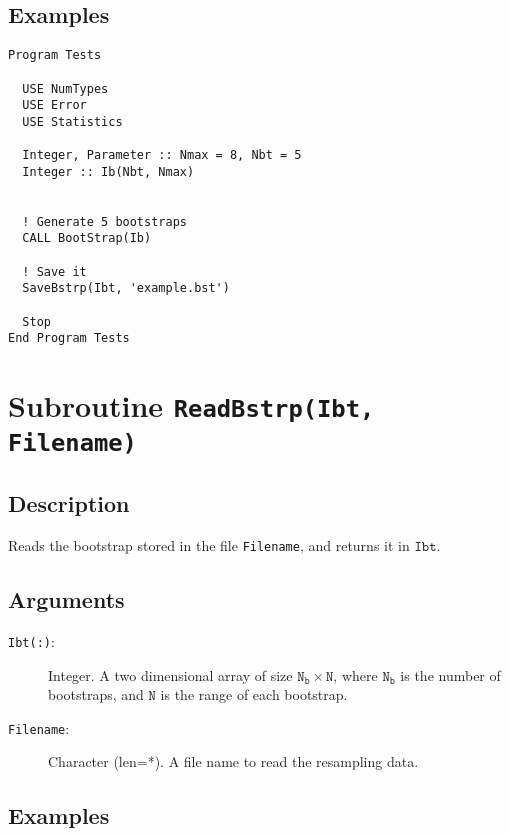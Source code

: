 \subsection{Examples}

\begin{lstlisting}[emph=SaveBstrp,
                   emphstyle=\color{blue},
                   frame=trBL,
                   caption=Reading the resampling info.,
                   label=SaveBstrp]
Program Tests

  USE NumTypes
  USE Error
  USE Statistics

  Integer, Parameter :: Nmax = 8, Nbt = 5
  Integer :: Ib(Nbt, Nmax)


  ! Generate 5 bootstraps
  CALL BootStrap(Ib)

  ! Save it
  SaveBstrp(Ibt, 'example.bst')

  Stop
End Program Tests
\end{lstlisting}

\section{Subroutine \texttt{ReadBstrp(Ibt, Filename)}}

\subsection{Description}

Reads the bootstrap stored in the file \texttt{Filename}, and returns
it in  $\mathtt{Ibt}$.

\subsection{Arguments}

\begin{description}
\item[\texttt{Ibt(:)}:] Integer. A two dimensional array of size
  $\mathtt{N_b\times N}$, where $\mathtt{N_b}$ is the number of
  bootstraps, and $\mathtt{N}$ is the range of each bootstrap.
\item[\texttt{Filename}: ] Character (len=*). A file name to read the
  resampling data.
\end{description}

\subsection{Examples}

